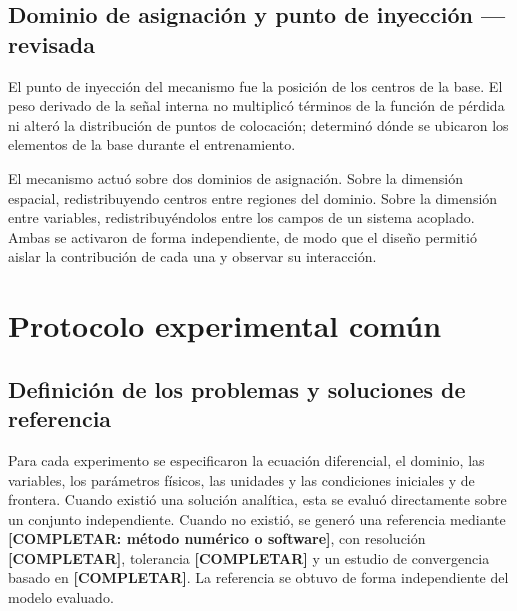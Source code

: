 
\subsection{Dominio de asignación y punto de inyección — revisada}

El punto de inyección del mecanismo fue la posición de los centros de la base. El peso derivado de la señal interna no multiplicó términos de la función de pérdida ni alteró la distribución de puntos de colocación; determinó dónde se ubicaron los elementos de la base durante el entrenamiento.

El mecanismo actuó sobre dos dominios de asignación. Sobre la dimensión espacial, redistribuyendo centros entre regiones del dominio. Sobre la dimensión entre variables, redistribuyéndolos entre los campos de un sistema acoplado. Ambas se activaron de forma independiente, de modo que el diseño permitió aislar la contribución de cada una y observar su interacción.


\section{Protocolo experimental común}
\label{subsec:protocolo-comun}

\subsection{Definición de los problemas y soluciones de referencia}

Para cada experimento se especificaron la ecuación diferencial, el dominio, las variables, los parámetros físicos, las unidades y las condiciones iniciales y de frontera. Cuando existió una solución analítica, esta se evaluó directamente sobre un conjunto independiente. Cuando no existió, se generó una referencia mediante \textbf{[COMPLETAR: método numérico o software]}, con resolución \textbf{[COMPLETAR]}, tolerancia \textbf{[COMPLETAR]} y un estudio de convergencia basado en \textbf{[COMPLETAR]}. La referencia se obtuvo de forma independiente del modelo evaluado.

